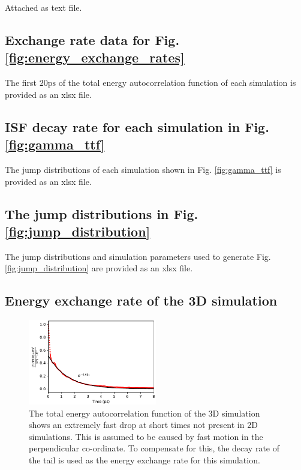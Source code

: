 \documentclass[7pt]{article}
\newcommand{\ps}{\si{\pico\second}}
\begin{document}
Attached as text file.

\subsection*{Exchange rate data for Fig. \ref{fig:energy_exchange_rates}}

The first $20\ps$ of the total energy autocorrelation function of each simulation is provided as an xlsx file.

\subsection*{ISF decay rate for each simulation in Fig. \ref{fig:gamma_ttf}}

The jump distributions of each simulation shown in Fig. \ref{fig:gamma_ttf} is provided as an xlsx file.

\subsection*{The jump distributions in Fig. \ref{fig:jump_distribution}}

The jump distributions and simulation parameters used to generate Fig. \ref{fig:jump_distribution} are provided as an xlsx file.


\subsection*{Energy exchange rate of the 3D simulation}

\begin{figure}
	\centering
	\includegraphics[width=0.5\textwidth]{MD_e_auto}
	\caption{The total energy autocorrelation function of the 3D simulation shows an extremely fast drop at short times not present in 2D simulations. This is assumed to be caused by fast motion in the perpendicular co-ordinate. To compensate for this, the decay rate of the tail is used as the energy exchange rate for this simulation.} 
	\label{fig:MD_e_auto}
\end{figure}
\end{document}
